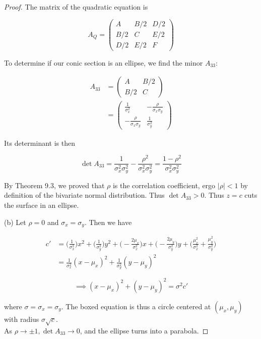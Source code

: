\documentclass[10pt, oneside]{article}   	%
\theoremstyle{definition}
\begin{document}
\begin{enumerate}[label=9.\arabic*]
\begin{proof}
The matrix of the quadratic equation is

\begingroup
\renewcommand*{\arraystretch}{3}
\[ A_Q = \begin{pmatrix}
A & B/2 & D/2 \\
B/2 & C & E/2 \\
D/2 & E/2 & F
\end{pmatrix} \]
\endgroup

To determine if our conic section is an ellipse, we find the minor $A_{33}$:

\begingroup
\renewcommand*{\arraystretch}{3}
\begin{align*}
A_{33} &= \begin{pmatrix}
A & B/2 \\
B/2 & C
\end{pmatrix} \\
&= \begin{pmatrix}
\frac{1}{\sigma^2_x}  & -\frac{\rho}{\sigma_x \sigma_y} \\
-\frac{\rho}{\sigma_x \sigma_y} & \frac{1}{\sigma^2_y}
\end{pmatrix}
\end{align*}
\endgroup

Its determinant is then

\[ \det A_{33} = \frac{1}{\sigma^2_x \sigma^2_y} - \frac{\rho^2}{\sigma^2_x \sigma^2_y} = \frac{1-\rho^2}{\sigma^2_x \sigma^2_y} \]

By Theorem 9.3, we proved that $\rho$ is the correlation coefficient, ergo $|\rho| < 1$ by definition of the bivariate normal distribution. Thus $\det A_{33} > 0$. Thus $z = c$ cuts the surface in an ellipse.

(b) Let $\rho = 0$ and $\sigma_x = \sigma_y$. Then we have

\begin{align*}
c' &= \bigg( \frac{1}{\sigma^2_x} \bigg) x^2 + \bigg( \frac{1}{\sigma^2_y} \bigg) y^2 + \bigg( -\frac{2\mu_x}{\sigma^2_x} \bigg) x + \bigg(- \frac{2\mu_y}{\sigma^2_y} \bigg) y + \bigg( \frac{\mu^2_x}{\sigma^2_x} + \frac{\mu^2_y}{\sigma^2_y}  \bigg) \\
&= \frac{1}{\sigma^2_x} (x-\mu_x)^2 + \frac{1}{\sigma^2_y} (y - \mu_y)^2
\end{align*}

\[ \implies \boxed{ (x-\mu_x)^2 + (y - \mu_y)^2 = \sigma^2 c' } \]

where $\sigma = \sigma_x = \sigma_y$. The boxed equation is thus a circle centered at $(\mu_x, \mu_y)$ with radius $\sigma \sqrt{c}$. \\
As $\rho \rightarrow \pm 1, \det A_{33} \rightarrow 0$, and the ellipse turns into a parabola.


\end{proof}
\end{enumerate}
\end{document}
